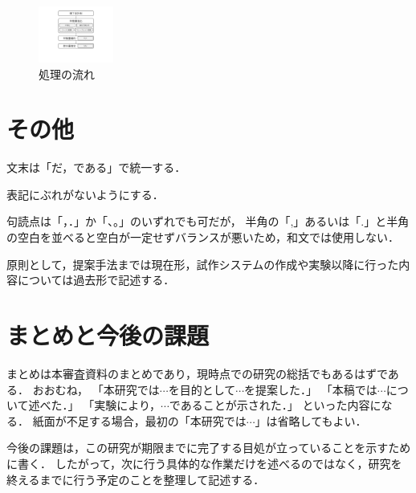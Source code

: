 \documentclass[paper=a4paper,fontsize=10pt,jafontscale=0.925,twocolumn]{jlreq}
\begin{document}
\begin{figure}[tp]
 \centering
 \includegraphics[width=0.22\textwidth]{flowchart.pdf}
 \caption{処理の流れ}
 \label{fig:flow}
\end{figure}

\section{その他}

文末は「だ，である」で統一する．

表記にぶれがないようにする．

句読点は「，．」か「、。」のいずれでも可だが，
半角の「,」あるいは「.」と半角の空白を並べると空白が一定せずバランスが悪いため，和文では使用しない．

原則として，提案手法までは現在形，試作システムの作成や実験以降に行った内容については過去形で記述する．

\section{まとめと今後の課題} %

まとめは本審査資料のまとめであり，現時点での研究の総括でもあるはずである．
おおむね，
「本研究では$\cdots$を目的として$\cdots$を提案した．」
「本稿では$\cdots$について述べた．」
「実験により，$\cdots$であることが示された．」
といった内容になる．
紙面が不足する場合，最初の「本研究では$\cdots$」は省略してもよい．

今後の課題は，この研究が期限までに完了する目処が立っていることを示すために書く．
したがって，次に行う具体的な作業だけを述べるのではなく，研究を終えるまでに行う予定のことを整理して記述する．



\end{document}

